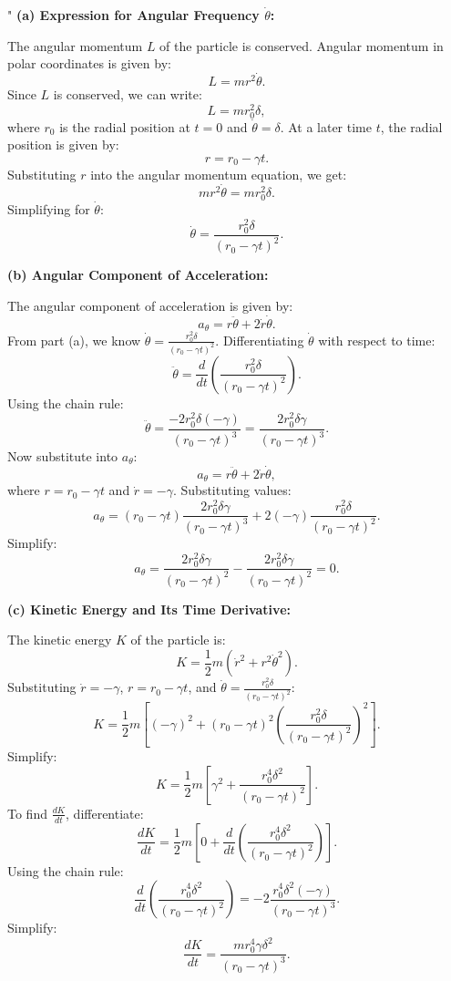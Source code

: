 "
\textbf{(a) Expression for Angular Frequency \( \dot{\theta} \):}

The angular momentum \( L \) of the particle is conserved. Angular momentum in polar coordinates is given by:
\[
L = m r^2 \dot{\theta}.
\]
Since \( L \) is conserved, we can write:
\[
L = m r_0^2 \delta,
\]
where \( r_0 \) is the radial position at \( t = 0 \) and \( \dot{\theta} = \delta \). At a later time \( t \), the radial position is given by:
\[
r = r_0 - \gamma t.
\]
Substituting \( r \) into the angular momentum equation, we get:
\[
m r^2 \dot{\theta} = m r_0^2 \delta.
\]
Simplifying for \( \dot{\theta} \):
\[
\dot{\theta} = \frac{r_0^2 \delta}{(r_0 - \gamma t)^2}.
\]

\textbf{(b) Angular Component of Acceleration:}

The angular component of acceleration is given by:
\[
a_\theta = r \ddot{\theta} + 2 \dot{r} \dot{\theta}.
\]
From part (a), we know \( \dot{\theta} = \frac{r_0^2 \delta}{(r_0 - \gamma t)^2} \). Differentiating \( \dot{\theta} \) with respect to time:
\[
\ddot{\theta} = \frac{d}{dt} \left( \frac{r_0^2 \delta}{(r_0 - \gamma t)^2} \right).
\]
Using the chain rule:
\[
\ddot{\theta} = \frac{-2 r_0^2 \delta (-\gamma)}{(r_0 - \gamma t)^3} = \frac{2 r_0^2 \delta \gamma}{(r_0 - \gamma t)^3}.
\]
Now substitute into \( a_\theta \):
\[
a_\theta = r \ddot{\theta} + 2 \dot{r} \dot{\theta},
\]
where \( r = r_0 - \gamma t \) and \( \dot{r} = -\gamma \). Substituting values:
\[
a_\theta = (r_0 - \gamma t) \frac{2 r_0^2 \delta \gamma}{(r_0 - \gamma t)^3} + 2(-\gamma) \frac{r_0^2 \delta}{(r_0 - \gamma t)^2}.
\]
Simplify:
\[
a_\theta = \frac{2 r_0^2 \delta \gamma}{(r_0 - \gamma t)^2} - \frac{2 r_0^2 \delta \gamma}{(r_0 - \gamma t)^2} = 0.
\]

\textbf{(c) Kinetic Energy and Its Time Derivative:}

The kinetic energy \( K \) of the particle is:
\[
K = \frac{1}{2} m \left( \dot{r}^2 + r^2 \dot{\theta}^2 \right).
\]
Substituting \( \dot{r} = -\gamma \), \( r = r_0 - \gamma t \), and \( \dot{\theta} = \frac{r_0^2 \delta}{(r_0 - \gamma t)^2} \):
\[
K = \frac{1}{2} m \left[ (-\gamma)^2 + (r_0 - \gamma t)^2 \left( \frac{r_0^2 \delta}{(r_0 - \gamma t)^2} \right)^2 \right].
\]
Simplify:
\[
K = \frac{1}{2} m \left[ \gamma^2 + \frac{r_0^4 \delta^2}{(r_0 - \gamma t)^2} \right].
\]
To find \( \frac{dK}{dt} \), differentiate:
\[
\frac{dK}{dt} = \frac{1}{2} m \left[ 0 + \frac{d}{dt} \left( \frac{r_0^4 \delta^2}{(r_0 - \gamma t)^2} \right) \right].
\]
Using the chain rule:
\[
\frac{d}{dt} \left( \frac{r_0^4 \delta^2}{(r_0 - \gamma t)^2} \right) = -2 \frac{r_0^4 \delta^2 (-\gamma)}{(r_0 - \gamma t)^3}.
\]
Simplify:
\[
\frac{dK}{dt} = \frac{m r_0^4 \gamma \delta^2}{(r_0 - \gamma t)^3}.
\]

